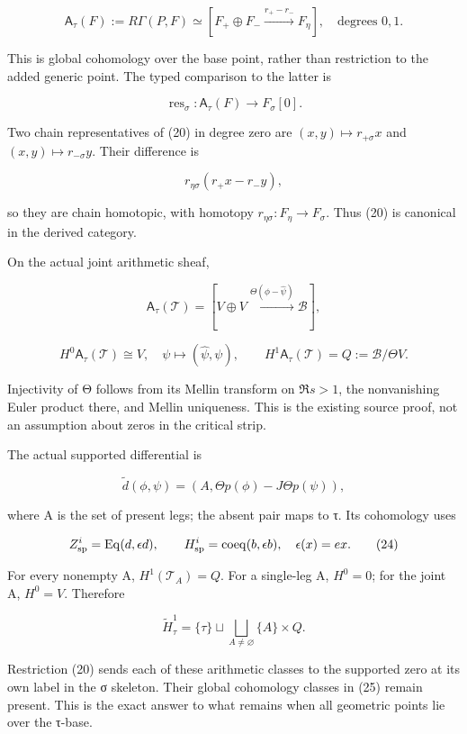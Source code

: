 \documentclass[
]{article}
\begin{document}
\[
\mathsf A_\tau(F):=R\Gamma(P,F)
\simeq[F_+\oplus F_-\xrightarrow{r_+-r_-}F_\eta],
\quad\text{degrees }0,1.
\tag{19}
\]

This is global cohomology over the base point, rather than restriction
to the added generic point. The typed comparison to the latter is

\[
\operatorname{res}_\sigma:\mathsf A_\tau(F)\longrightarrow F_\sigma[0].
\tag{20}
\]

Two chain representatives of (20) in degree zero are
\((x,y)\mapsto r_{+\sigma}x\) and \((x,y)\mapsto r_{-\sigma}y\). Their
difference is

\[
r_{\eta\sigma}(r_+x-r_-y),
\]

so they are chain homotopic, with homotopy
\(r_{\eta\sigma}:F_\eta\to F_\sigma\). Thus (20) is canonical in the
derived category.

On the actual joint arithmetic sheaf,

\[
\mathsf A_\tau(\mathcal T)
=[V\oplus V\xrightarrow{\Theta(\phi-\widehat\psi)}\mathscr B],
\tag{21}
\]

\[
H^0\mathsf A_\tau(\mathcal T)\cong V,
\quad \psi\mapsto(\widehat\psi,\psi),
\qquad
H^1\mathsf A_\tau(\mathcal T)=Q:=\mathscr B/\Theta V.
\tag{22}
\]

Injectivity of Θ follows from its Mellin transform on \(\Re s>1\), the
nonvanishing Euler product there, and Mellin uniqueness. This is the
existing source proof, not an assumption about zeros in the critical
strip.

The actual supported differential is

\[
\widetilde d(\phi,\psi)
=(A,\Theta p(\phi)-J\Theta p(\psi)),
\tag{23}
\]

where A is the set of present legs; the absent pair maps to τ. Its
cohomology uses

\[
Z^i_{\rm sp}=\operatorname{Eq}(d,\epsilon d),
\qquad
H^i_{\rm sp}=\operatorname{coeq}(b,\epsilon b),
\quad\epsilon(x)=ex.
\tag{24}
\]

For every nonempty A, \(H^1(\mathcal T_A)=Q\). For a single-leg A,
\(H^0=0\); for the joint A, \(H^0=V\). Therefore

\[
\widetilde H^1_\tau
=\{\tau\}\sqcup\bigsqcup_{A\ne\varnothing}\{A\}\times Q.
\tag{25}
\]

Restriction (20) sends each of these arithmetic classes to the supported
zero at its own label in the σ skeleton. Their global cohomology classes
in (25) remain present. This is the exact answer to what remains when
all geometric points lie over the τ-base.
\end{document}
